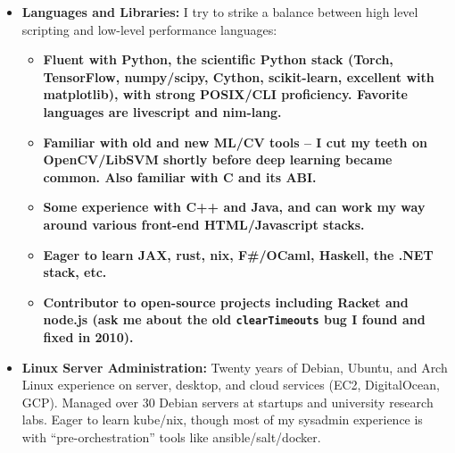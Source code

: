 \documentclass[10pt,letterpaper]{article}
\begin{document}
\begin{itemize}
\item \textbf{Languages and Libraries:}
  I try to strike a balance between high level scripting and low-level performance languages:
  \begin{itemize}
  \item \bfseries{Fluent} with Python, the scientific Python stack (Torch, TensorFlow, numpy/scipy,
  Cython, scikit-learn, excellent with matplotlib),
  with strong POSIX/CLI proficiency. %
  Favorite languages are livescript and nim-lang.
  \item \bfseries{Familiar} with old and new ML/CV tools -- I cut my teeth on OpenCV/LibSVM shortly before deep learning became common. Also familiar with C and its ABI.
  \item \bfseries{Some experience} with C++ and Java, and can work my way around various front-end HTML/Javascript stacks.
  \item \bfseries{Eager to learn} JAX, rust, nix, F\#/OCaml, Haskell, the .NET stack, etc.
  \item \bfseries{Contributor} to open-source projects including Racket and node.js (ask me about the old \verb+clearTimeouts+ bug I found and fixed in 2010).
  \end{itemize}
\item \textbf{Linux Server Administration:}
  Twenty years of Debian, Ubuntu, and Arch Linux experience on server,
  desktop, and cloud services (EC2, Digital\-Ocean, GCP). Managed over 30
  Debian servers at startups and university research labs.
  Eager to learn kube/nix, though most of my sysadmin experience
  is with ``pre-orchestration'' tools like ansible/salt/docker.
\end{itemize}
\vspace{-5pt}
\end{document}
